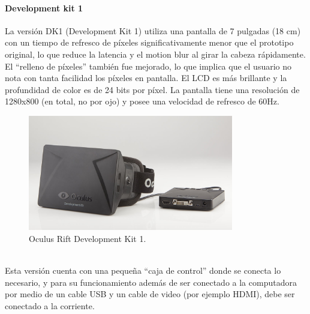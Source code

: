 \documentclass[12pt]{article}
\begin{document}
\paragraph{Development kit 1}
La versión DK1 (Development Kit 1) utiliza una pantalla de 7 pulgadas (18 cm) con un tiempo de refresco de píxeles significativamente menor que el prototipo original, lo que reduce la latencia y el motion blur al girar la cabeza rápidamente. El “relleno de píxeles” también fue mejorado, lo que  implica que el usuario no nota con tanta facilidad los píxeles en pantalla. El LCD es más brillante y la profundidad de color es de 24 bits por píxel. La pantalla tiene una resolución de 1280x800 (en total, no por ojo) y posee una velocidad de refresco de 60Hz.
\begin{figure}[h!]
\includegraphics[width=0.8\textwidth,center]{dk1.jpg}
\caption{Oculus Rift Development Kit 1.}
\end{figure}
\\Esta versión cuenta con una pequeña “caja de control” donde se conecta lo necesario, y para su funcionamiento además de ser conectado a la computadora por medio de un cable USB y un cable de video (por ejemplo HDMI), debe ser conectado a la corriente.
\end{document}
